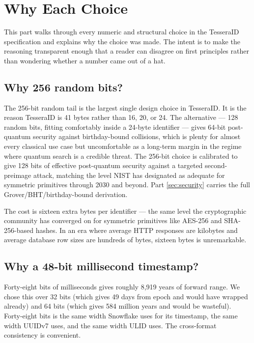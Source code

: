 \section{Why Each Choice}
\label{sec:rationale}

This part walks through every numeric and structural choice in the TesseraID specification and explains why the choice was made. The intent is to make the reasoning transparent enough that a reader can disagree on first principles rather than wondering whether a number came out of a hat.

\subsection{Why 256 random bits?}

The 256-bit random tail is the largest single design choice in TesseraID. It is the reason TesseraID is 41 bytes rather than 16, 20, or 24. The alternative --- 128 random bits, fitting comfortably inside a 24-byte identifier --- gives 64-bit post-quantum security against birthday-bound collisions, which is plenty for almost every classical use case but uncomfortable as a long-term margin in the regime where quantum search is a credible threat. The 256-bit choice is calibrated to give 128 bits of effective post-quantum security against a targeted second-preimage attack, matching the level NIST has designated as adequate for symmetric primitives through 2030 and beyond. Part \ref{sec:security} carries the full Grover/BHT/birthday-bound derivation.

The cost is sixteen extra bytes per identifier --- the same level the cryptographic community has converged on for symmetric primitives like AES-256 \citep{fips197} and SHA-256-based \citep{fips180} hashes. In an era where average HTTP responses are kilobytes and average database row sizes are hundreds of bytes, sixteen bytes is unremarkable.

\subsection{Why a 48-bit millisecond timestamp?}

Forty-eight bits of milliseconds gives roughly 8{,}919 years of forward range. We chose this over 32 bits (which gives 49 days from epoch and would have wrapped already) and 64 bits (which gives 584 million years and would be wasteful). Forty-eight bits is the same width Snowflake \citep{snowflake} uses for its timestamp, the same width UUIDv7 \citep{rfc9562} uses, and the same width ULID \citep{ulid} uses. The cross-format consistency is convenient.

